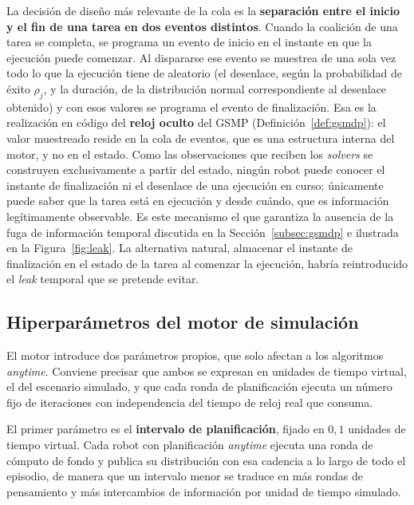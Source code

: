 La decisión de diseño más relevante de la cola es la \textbf{separación entre el inicio y el fin de una tarea en dos eventos distintos}. Cuando la coalición de una tarea se completa, se programa un evento de inicio en el instante en que la ejecución puede comenzar. Al dispararse ese evento se muestrea de una sola vez todo lo que la ejecución tiene de aleatorio (el desenlace, según la probabilidad de éxito $\rho_j$, y la duración, de la distribución normal correspondiente al desenlace obtenido) y con esos valores se programa el evento de finalización. Esa es la realización en código del \textbf{reloj oculto} del GSMP (Definición~\ref{def:gsmdp}): el valor muestreado reside en la cola de eventos, que es una estructura interna del motor, y no en el estado. Como las observaciones que reciben los \textit{solvers} se construyen exclusivamente a partir del estado, ningún robot puede conocer el instante de finalización ni el desenlace de una ejecución en curso; únicamente puede saber que la tarea está en ejecución y desde cuándo, que es información legítimamente observable. Es este mecanismo el que garantiza la ausencia de la fuga de información temporal discutida en la Sección~\ref{subsec:gsmdp} e ilustrada en la Figura~\ref{fig:leak}. La alternativa natural, almacenar el instante de finalización en el estado de la tarea al comenzar la ejecución, habría reintroducido el \textit{leak} temporal que se pretende evitar.

\subsection{Hiperparámetros del motor de simulación} \label{subsec:mat-hiperparams-motor}

El motor introduce dos parámetros propios, que solo afectan a los algoritmos \textit{anytime}. Conviene precisar que ambos se expresan en unidades de tiempo virtual, el del escenario simulado, y que cada ronda de planificación ejecuta un número fijo de iteraciones con independencia del tiempo de reloj real que consuma.

El primer parámetro es el \textbf{intervalo de planificación}, fijado en $0{,}1$ unidades de tiempo virtual. Cada robot con planificación \textit{anytime} ejecuta una ronda de cómputo de fondo y publica su distribución con esa cadencia a lo largo de todo el episodio, de manera que un intervalo menor se traduce en más rondas de pensamiento y más intercambios de información por unidad de tiempo simulado.

